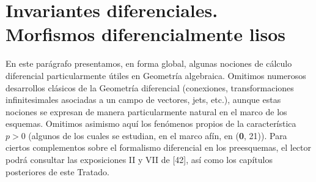 \section{Invariantes diferenciales. Morfismos diferencialmente lisos}
\label{section:IV.16}

En este parágrafo presentamos, en forma global, algunas nociones de cálculo
diferencial particularmente útiles en Geometría algebraica. Omitimos numerosos
desarrollos clásicos de la Geometría diferencial (conexiones, transformaciones
infinitesimales asociadas a un campo de vectores, jets, etc.), aunque estas nociones
se expresan de manera particularmente natural en el marco de los esquemas. Omitimos
asimismo aquí los fenómenos propios de la característica $p>0$ (algunos de los cuales
se estudian, en el marco afín, en (\textbf 0, 21)). Para ciertos complementos sobre el
formalismo diferencial en los preesquemas, el lector podrá consultar las exposiciones
II y VII de [42], así como los capítulos posteriores de este Tratado.
